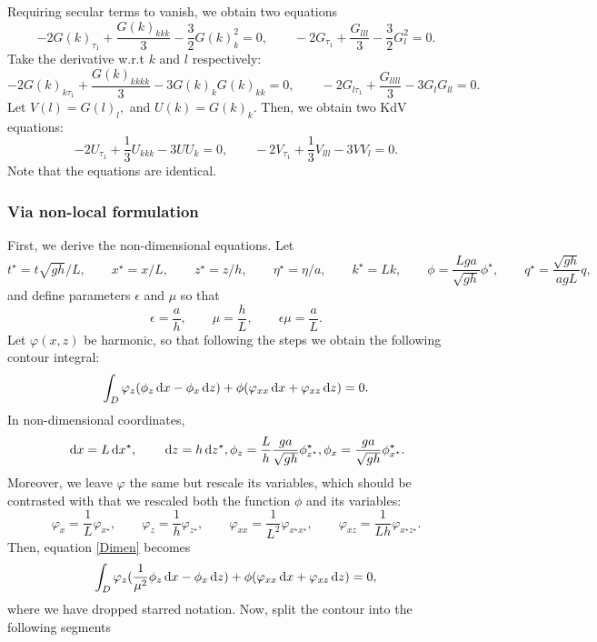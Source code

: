 \documentclass[10pt,reqno,oneside,a4paper]{article}
\begin{document}
Requiring secular terms to vanish, we obtain two equations
\[ -2G(k)_{\tau_{1}} + \frac{G(k)_{kkk}}{3} - \frac{3}{2}G(k)_k^2 = 0, \qquad -2G_{\tau_{1}} + \frac{G_{lll}}{3} - \frac{3}{2}G_l^2 = 0. \]
Take the derivative w.r.t $k$ and $l$ respectively:
\[ -2G(k)_{k\tau_{1}} + \frac{G(k)_{kkkk}}{3} - 3G(k)_kG(k)_{kk}= 0, \qquad -2G_{l\tau_{1}} + \frac{G_{llll}}{3} - 3G_lG_{ll} = 0. \]
Let $V(l) = G(l)_l,$ and $U(k) = G(k)_k.$ Then, we obtain two KdV equations:
\[ 
-2U_{\tau_{1}} + \frac{1}{3}U_{kkk} - 3UU_k= 0, \qquad -2V_{\tau_1} + \frac{1}{3}V_{lll} - 3VV_l = 0.
\]
Note that the equations are identical.
\subsubsection{Via non-local formulation}
First, we derive the non-dimensional equations. Let 
\begin{equation}\label{NDcoord}
t^{\star} = t \sqrt{gh}/L, \qquad x^{\star}  = x/L, \qquad z^{\star}  = z/h, \qquad \eta^{\star}  = \eta/a, \qquad k^{\star}  = Lk, \qquad \phi = \frac{Lga}{\sqrt{gh}} \phi^{\star}, \qquad q^{\star}  = \frac{\sqrt{gh}}{agL} q,
\end{equation}
and define parameters $\epsilon$ and $\mu$ so that
\[ 
\epsilon = \frac{a}{h}, \qquad \mu = \frac{h}{L}, \qquad \epsilon \mu = \frac{a}{L}.
\] 
Let $\varphi(x,z)$ be harmonic, so that following the steps we obtain the following contour integral:
\begin{equation}\label{Dimen}
\int_D \varphi_z(\phi_z \,\mathrm{d} x - \phi_x \,\mathrm{d} z) + \phi(\varphi_{xx} \,\mathrm{d} x + \varphi_{xz} \,\mathrm{d} z) = 0.
\end{equation}
In non-dimensional coordinates,
\[ 
\,\mathrm{d} x = L \,\mathrm{d} x^{\star}, \qquad \,\mathrm{d} z = h \,\mathrm{d} z^{\star}, \phi_z = \frac{L}{h}\frac{ga}{\sqrt{gh}} \phi^{\star}_{z^{\star}}, \phi_x = \frac{ga}{\sqrt{gh}} \phi^{\star}_{x^{\star}}.
\]
Moreover, we leave $\varphi$ the same but rescale its variables, which should be contrasted with that we rescaled both the function $\phi$ and its variables:
\[ 
\varphi_x = \frac{1}{L} \varphi_{x^{\star}}, \qquad \varphi_z = \frac{1}{h} \varphi_{z^{\star}}, \qquad \varphi_{xx} = \frac{1}{L^2} \varphi_{x^{\star}x^{\star}}, \qquad \varphi_{xz} = \frac{1}{Lh} \varphi_{x^{\star}z^{\star}}.
\]
Then, equation \eqref{Dimen} becomes 
\begin{equation}\label{NondimD}
\int_D \varphi_z(\frac{1}{\mu^2}\phi_z \,\mathrm{d} x - \phi_x \,\mathrm{d} z) + \phi(\varphi_{xx} \,\mathrm{d} x + \varphi_{xz} \,\mathrm{d} z) = 0,
\end{equation}
where we have dropped starred notation. Now, split the contour into the following segments
\end{document}
